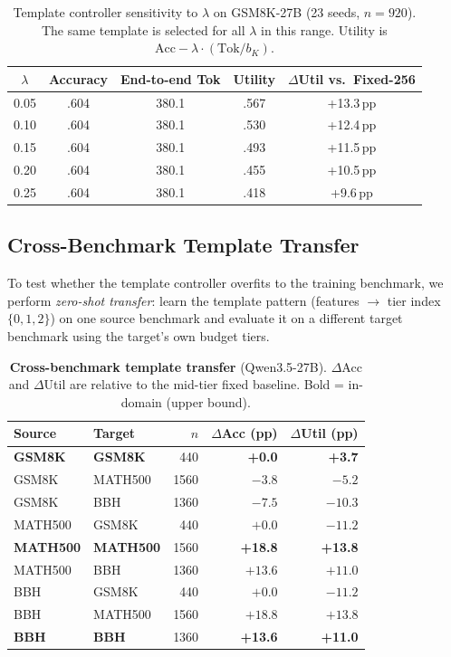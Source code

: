 \begin{table}[ht]
\centering
\caption{Template controller sensitivity to $\lambda$ on GSM8K-27B (23 seeds, $n{=}920$). The same template is selected for all $\lambda$ in this range. Utility is $\text{Acc} - \lambda \cdot (\text{Tok}/b_K)$.}
\label{tab:lambda-sensitivity}
\small
\begin{tabular}{@{}ccccc@{}}
\toprule
$\lambda$ & \textbf{Accuracy} & \textbf{End-to-end Tok} & \textbf{Utility} & $\Delta$\textbf{Util vs.\ Fixed-256} \\
\midrule
0.05 & .604 & 380.1 & .567 & +13.3\,pp \\
0.10 & .604 & 380.1 & .530 & +12.4\,pp \\
0.15 & .604 & 380.1 & .493 & +11.5\,pp \\
0.20 & .604 & 380.1 & .455 & +10.5\,pp \\
0.25 & .604 & 380.1 & .418 & +9.6\,pp \\
\bottomrule
\end{tabular}
\end{table}

\subsection{Cross-Benchmark Template Transfer}
\label{app:transfer}

To test whether the template controller overfits to the training benchmark, we perform \emph{zero-shot transfer}: learn the template pattern (features $\to$ tier index $\{0,1,2\}$) on one source benchmark and evaluate it on a different target benchmark using the target's own budget tiers.

\begin{table}[ht]
\centering
\caption{\textbf{Cross-benchmark template transfer} (Qwen3.5-27B). $\Delta$Acc and $\Delta$Util are relative to the mid-tier fixed baseline. Bold = in-domain (upper bound).}
\label{tab:transfer}
\small
\begin{tabular}{@{}ll rrr@{}}
\toprule
\textbf{Source} & \textbf{Target} & $n$ & $\Delta$\textbf{Acc (pp)} & $\Delta$\textbf{Util (pp)} \\
\midrule
\textbf{GSM8K} & \textbf{GSM8K} & 440 & \textbf{+0.0} & \textbf{+3.7} \\
GSM8K & MATH500 & 1560 & $-3.8$ & $-5.2$ \\
GSM8K & BBH & 1360 & $-7.5$ & $-10.3$ \\
\midrule
MATH500 & GSM8K & 440 & $+0.0$ & $-11.2$ \\
\textbf{MATH500} & \textbf{MATH500} & 1560 & \textbf{+18.8} & \textbf{+13.8} \\
MATH500 & BBH & 1360 & $+13.6$ & $+11.0$ \\
\midrule
BBH & GSM8K & 440 & $+0.0$ & $-11.2$ \\
BBH & MATH500 & 1560 & $+18.8$ & $+13.8$ \\
\textbf{BBH} & \textbf{BBH} & 1360 & \textbf{+13.6} & \textbf{+11.0} \\
\bottomrule
\end{tabular}
\end{table}

